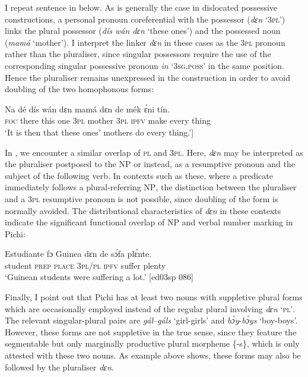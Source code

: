 I repeat sentence  in  below. As is generally the case in dislocated possessive constructions, a personal pronoun coreferential with the possessor (\textit{dɛn} ‘\textsc{3pl}’) links the plural possessor (\textit{dís wán dɛn} ‘these ones’) and the possessed noun (\textit{mamá} ‘mother’). I interpret the linker \textit{dɛn} in these cases as the \textsc{3pl} pronoun rather than the pluraliser, since singular possessors require the use of the corresponding singular possessive pronoun \textit{in} ‘\textsc{3sg.poss}’ in the same position. Hence the pluraliser remains unexpressed in the construction in order to avoid doubling of the two homophonous forms:



\ea%
    \label{ex:key:220}
    \gll Na  dé    dís  wán    dɛn    mamá  dɛn  de  mék    ɛ́ni    tín.\\
\textsc{foc}  there  this  one    \textsc{3pl}    mother  \textsc{3pl}  \textsc{ipfv}  make  every  thing\\

\glt ‘It is then that these ones’ mothers do every thing.’\textstylePichiglossZchn{ [ab03ay 047}]
\z

In , we encounter a similar overlap of \textsc{pl} and \textsc{3pl}. Here, \textit{dɛn} may be interpreted as the pluraliser postposed to the \textsc{NP} or instead, as a resumptive pronoun and the subject of the following verb. In contexts such as these, where a predicate immediately follows a plural-referring \textsc{NP}, the distinction between the pluraliser and a \textsc{3pl} resumptive pronoun is not possible, since doubling of the form is normally avoided. The distributional characteristics of \textit{dɛn} in these contexts indicate the significant functional overlap of \textsc{NP} and verbal number marking in Pichi:


\ea%
    \label{ex:key:221}
    \gll Estudiante  fɔ  Guinea  dɛn    de  sɔ́fa    plɛ́nte.\\
student    \textsc{prep}  \textsc{place}  \textsc{3pl/pl}  \textsc{ipfv}  suffer  plenty\\

\glt ‘Guinean students were suffering a lot.’ [ed03sp 086]
\z

Finally, I point out that Pichi has at least two nouns with suppletive plural forms which are occasionally employed instead of the regular plural involving \textit{dɛn} ‘\textsc{pl’}. The relevant singular-plural pairs are \textit{gál}–\textit{gáls} ‘girl-girls’ and \textit{bɔ́y}{}-\textit{bɔ́ys} ‘boy-boys’. However, these forms are not suppletive in the true sense, since they feature the segmentable but only marginally productive plural morpheme \{-s\}, which is only attested with these two nouns. As example  above shows, these forms may also be followed by the pluraliser \textit{dɛn}. 


